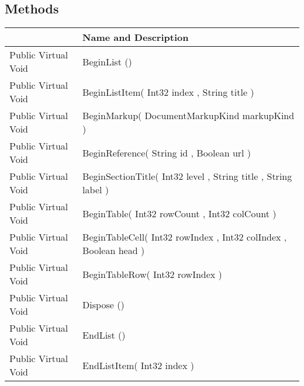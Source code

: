 \documentclass[11pt, oneside, a4paper]{book}
\begin{document}
\subsection{Methods}
\begin{center}
\begin{tabular}{| p{3cm} | p{12cm} | }
\hline
\textbf{ } & \textbf{ Name and Description}\\
\hline
 Public  Virtual  Void &  BeginList ()\hypertarget{SoftwareEngineeringTools.{}Documentation.{}WordGenerator.{}BeginList}{}\\
\hline
 Public  Virtual  Void &  BeginListItem(\hypertarget{SoftwareEngineeringTools.{}Documentation.{}WordGenerator.{}BeginListItem\_Int32\_String}{} Int32  index  ,  String  title  )\\
\hline
 Public  Virtual  Void &  BeginMarkup(\hypertarget{SoftwareEngineeringTools.{}Documentation.{}WordGenerator.{}BeginMarkup\_DocumentMarkupKind}{} DocumentMarkupKind  markupKind  )\\
\hline
 Public  Virtual  Void &  BeginReference(\hypertarget{SoftwareEngineeringTools.{}Documentation.{}WordGenerator.{}BeginReference\_String\_Boolean}{} String  id  ,  Boolean  url  )\\
\hline
 Public  Virtual  Void &  BeginSectionTitle(\hypertarget{SoftwareEngineeringTools.{}Documentation.{}WordGenerator.{}BeginSectionTitle\_Int32\_String\_String}{} Int32  level  ,  String  title  ,  String  label  )\\
\hline
 Public  Virtual  Void &  BeginTable(\hypertarget{SoftwareEngineeringTools.{}Documentation.{}WordGenerator.{}BeginTable\_Int32\_Int32}{} Int32  rowCount  ,  Int32  colCount  )\\
\hline
 Public  Virtual  Void &  BeginTableCell(\hypertarget{SoftwareEngineeringTools.{}Documentation.{}WordGenerator.{}BeginTableCell\_Int32\_Int32\_Boolean}{} Int32  rowIndex  ,  Int32  colIndex  ,  Boolean  head  )\\
\hline
 Public  Virtual  Void &  BeginTableRow(\hypertarget{SoftwareEngineeringTools.{}Documentation.{}WordGenerator.{}BeginTableRow\_Int32}{} Int32  rowIndex  )\\
\hline
 Public  Virtual  Void &  Dispose ()\hypertarget{SoftwareEngineeringTools.{}Documentation.{}WordGenerator.{}Dispose}{}\\
\hline
 Public  Virtual  Void &  EndList ()\hypertarget{SoftwareEngineeringTools.{}Documentation.{}WordGenerator.{}EndList}{}\\
\hline
 Public  Virtual  Void &  EndListItem(\hypertarget{SoftwareEngineeringTools.{}Documentation.{}WordGenerator.{}EndListItem\_Int32}{} Int32  index  )\\

\end{tabular}
\end{center}
\end{document}
